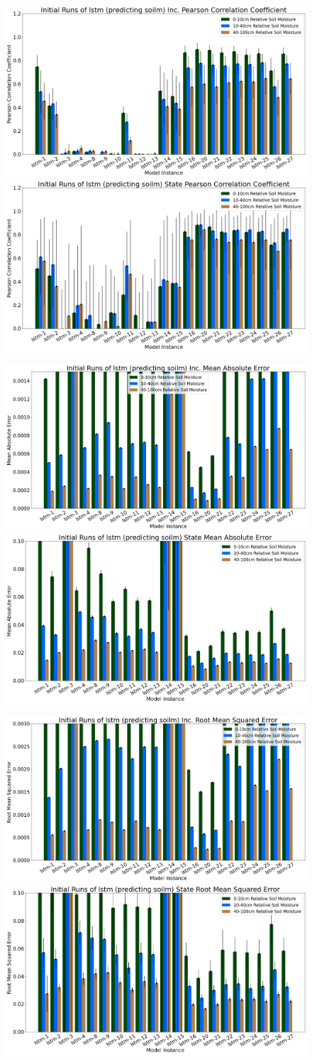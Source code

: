 \begin{figure}[hp!]
    \centering
    \includegraphics[width=.48\linewidth,draft=false]{figures/efficiency_initial-best/eval_test_efficiency_initial-lstm-soilm_cc_res.png}
    \includegraphics[width=.48\linewidth,draft=false]{figures/efficiency_initial-best/eval_test_efficiency_initial-lstm-soilm_cc_state.png}

    \includegraphics[width=.48\linewidth,draft=false]{figures/efficiency_initial-best/eval_test_efficiency_initial-lstm-soilm_mae_res.png}
    \includegraphics[width=.48\linewidth,draft=false]{figures/efficiency_initial-best/eval_test_efficiency_initial-lstm-soilm_mae_state.png}

    \includegraphics[width=.48\linewidth,draft=false]{figures/efficiency_initial-best/eval_test_efficiency_initial-lstm-soilm_mse_res.png}
    \includegraphics[width=.48\linewidth,draft=false]{figures/efficiency_initial-best/eval_test_efficiency_initial-lstm-soilm_mse_state.png}


\end{figure}
